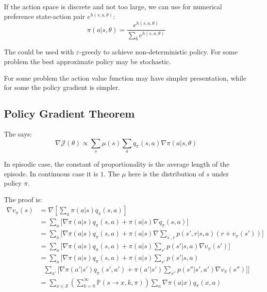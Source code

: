 If the action space is discrete and not too large, we can use  for numerical preference state-action pair $e^{h(s,a,\theta)}$:
\begin{equation}
	\pi(a|s, \theta) = \frac{e^{h(s,a,\theta)}}{\sum_b e^{h(s,a,\theta)}}
\end{equation}

The  could be used with $\varepsilon$-greedy to achieve non-deterministic policy. For some problem the best approximate policy may be stochastic.

For some problem the action value function may have simpler presentation, while for some the policy gradient is simpler.

\subsection{Policy Gradient Theorem}

The  says:
\begin{equation}
	\nabla \mathcal{J}(\theta ) \propto \sum_s \mu(s) \sum_a q_\pi (s,a) \nabla \pi(a|s, \theta )
\end{equation}

In episodic case, the constant of proportionality is the average length of the episode. In continuous case it is $1$. The $\mu$ here is the distribution of $s$ under policy $\pi$.

The proof is:
\begin{equation}
	\begin{aligned}
		\nabla v_\pi(s) &= \nabla \left[\sum_a \pi(a|s) q_\pi(s,a) \right] \\
		&= \sum_a \Big[ \nabla \pi(a|s) q_\pi(s,a) + \pi(a|s) \nabla q_\pi(s,a) \Big] \\
		&= \sum_a \Big[ \nabla \pi(a|s) q_\pi(s,a) + \pi(a|s) \nabla \sum_{s^{'},r} p(s',r|s,a) (r + v_\pi(s'))\Big] \\
		&= \sum_a \Big[ \nabla \pi(a|s) q_\pi(s,a) + \pi(a|s)\sum_{s'} p(s'|s,a) \nabla v_\pi(s') \Big] \\
		&= \sum_a \Big[  \nabla \pi(a|s) q_\pi(s,a) + \pi(a|s) \sum_{s'} p(s'|s,a) \\
		& \ \ \ \sum_{a'}\big[ \nabla \pi(a'|s')q_\pi(s',a') + \pi(a'|s') \sum_{s''} p(s''|s',a') \nabla v_\pi(s'') \big] \Big] \\
		&= \sum_{x \in \mathcal{S}} \left( \sum_{k=0}^\infty \mathbb{P}(s \rightarrow x, k, \pi ) \right) \sum_a \nabla \pi(a|x) q_\pi(x,a)
	\end{aligned}
\end{equation}

